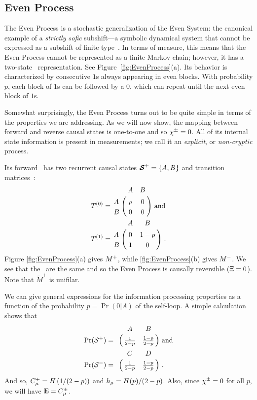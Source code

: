 \subsection{Even Process}

The Even Process is a stochastic generalization of the Even System: the
canonical example of a \emph{strictly sofic} subshift---a symbolic dynamical system
that cannot be expressed as a subshift of finite type~\cite{Weis73,Crut01a}.
In terms of measure, this means that the Even Process cannot be represented
as a finite Markov chain; however, it has a two-state \eM\ representation.
See Figure~\ref{fig:EvenProcess}(a). Its behavior is characterized by 
consecutive $1$s always appearing in even blocks.  With probability $p$, 
each block of $1$s can be followed by a $0$, which can repeat until the next 
even block of $1$s. 

Somewhat surprisingly, the Even Process turns out to be quite simple in 
terms of the properties we are addressing. As we will now show, the mapping 
between forward and reverse causal states is one-to-one and so $\chi^{\pm} = 0$. 
All of its internal state information is present in measurements; we call it 
an \emph{explicit}, or \emph{non-cryptic} process.

Its forward \eM\ has two recurrent causal states
${\boldsymbol{\mathcal{S}}}^{+} = \{ A, B \}$ and transition matrices~\cite{Crut01a}:
\begin{align*}
T^{(0)} &=
  \bordermatrix{%
      & A & B \cr
    A & p & 0 \cr
    B & 0   & 0
  }
  \mathrm{~and}\\
T^{(1)} &=
  \bordermatrix{%
      & A & B \cr
    A & 0 & 1-p \cr
    B & 1 & 0
  } ~.
\end{align*}
Figure \ref{fig:EvenProcess}(a) gives ${M}^{+}$, while
\ref{fig:EvenProcess}(b) gives ${M}^{-}$. We see that the \eMs\ are the same
and so the Even Process is causally reversible ($\Xi = 0$). Note
that $\widetilde{M}^+$ is unifilar.

We can give general expressions for the information processing properties 
as a function of the probability $p = \Pr(0|A)$ of the self-loop.
A simple calculation shows that
\begin{align*}
\Pr(\FutureCausalState) &=
  \bordermatrix{
      & A & B \cr
      & \tfrac{1}{2-p} & \tfrac{1-p}{2-p}
  }
  \mathrm{~and}\\
\Pr(\PastCausalState) &=
  \bordermatrix{
      & C & D\cr
      & \tfrac{1}{2-p} & \tfrac{1-p}{2-p}
  } ~.
\end{align*}
And so, $C_\mu^{+} = H \left( 1/(2-p) \right)$ and $h_\mu = H(p)/(2-p)$.
Also, since $\chi^{\pm} = 0$ for all $p$, we will have ${\bf E} = C_\mu^{\pm}$.

